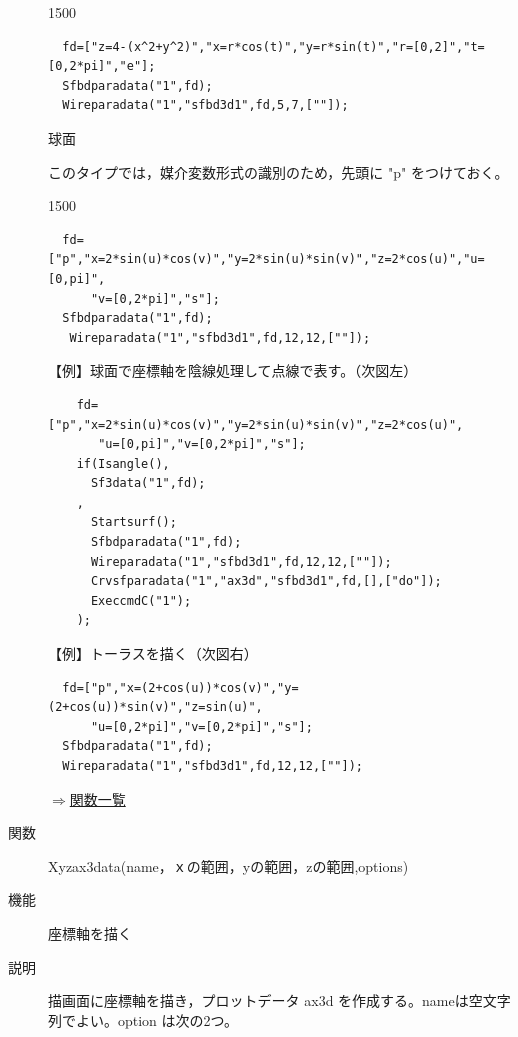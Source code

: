 \documentclass[papersize,a4paper,12pt,uplatex]{jsarticle}
\begin{document}
\begin{description}
\begin{layer}{150}{0}
\end{layer}
\begin{verbatim}
  fd=["z=4-(x^2+y^2)","x=r*cos(t)","y=r*sin(t)","r=[0,2]","t=[0,2*pi]","e"];
  Sfbdparadata("1",fd);
  Wireparadata("1","sfbd3d1",fd,5,7,[""]);
\end{verbatim}
\vspace{25mm}

球面

このタイプでは，媒介変数形式の識別のため，先頭に "p" をつけておく。

\begin{layer}{150}{0}
\end{layer}
\begin{verbatim}
  fd=["p","x=2*sin(u)*cos(v)","y=2*sin(u)*sin(v)","z=2*cos(u)","u=[0,pi]",
      "v=[0,2*pi]","s"];
  Sfbdparadata("1",fd);
   Wireparadata("1","sfbd3d1",fd,12,12,[""]); 
\end{verbatim}


\vspace{\baselineskip}
【例】球面で座標軸を陰線処理して点線で表す。（次図左）
\begin{verbatim}
    fd=["p","x=2*sin(u)*cos(v)","y=2*sin(u)*sin(v)","z=2*cos(u)",
       "u=[0,pi]","v=[0,2*pi]","s"];
    if(Isangle(),
      Sf3data("1",fd);
    ,
      Startsurf();
      Sfbdparadata("1",fd);
      Wireparadata("1","sfbd3d1",fd,12,12,[""]);
      Crvsfparadata("1","ax3d","sfbd3d1",fd,[],["do"]);
      ExeccmdC("1");
    );
\end{verbatim}
【例】トーラスを描く（次図右）
\begin{verbatim}
  fd=["p","x=(2+cos(u))*cos(v)","y=(2+cos(u))*sin(v)","z=sin(u)",
      "u=[0,2*pi]","v=[0,2*pi]","s"];
  Sfbdparadata("1",fd);
  Wireparadata("1","sfbd3d1",fd,12,12,[""]); 
\end{verbatim}
\vspace{\baselineskip}
    \begin{center}     \end{center}

\begin{flushright} \hyperlink{functionlist}{$\Rightarrow$関数一覧}\end{flushright}
\vspace{\baselineskip}
\hypertarget{xyzax3data}{}
\item[関数]  Xyzax3data(name，ｘの範囲，yの範囲，zの範囲,options)
\item[機能]  座標軸を描く
\item[説明]  描画面に座標軸を描き，プロットデータ ax3d  を作成する。nameは空文字列でよい。option は次の2つ。


\end{description}
\end{document}
